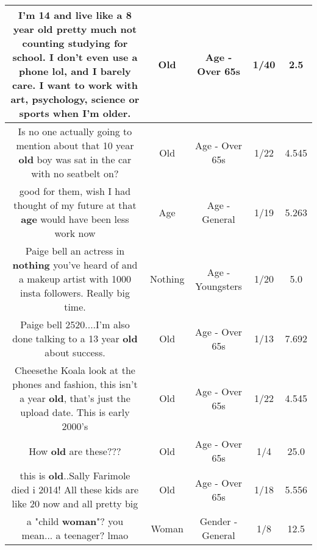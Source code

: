 \documentclass[11pt]{article}
\newlength\mylength
\begin{document}
\begin{center}
\begin{longtable}{|C{.65\mylength}|C{.30\mylength}|C{.12\mylength}|C{.12\mylength}|C{.12\mylength}|}
  \small I'm 14 and live like a 8 year \textbf{old} pretty much not counting studying for school. I don't even use a phone lol, and I barely care. I want to work with art, psychology, science or sports when I'm older.\normalsize   & Old & Age - Over 65s & 1/40 & 2.5 \\  \hline
  \small Is no one actually going to mention about that 10 year \textbf{old} boy was sat in the car with no seatbelt on?\normalsize   & Old & Age - Over 65s & 1/22 & 4.545 \\  \hline
  \small good for them, wish I had thought of my future at that \textbf{age} would have been less work now\normalsize   & Age & Age - General & 1/19 & 5.263 \\  \hline
  \small Paige bell an actress in \textbf{nothing} you've heard of and a makeup artist with 1000 insta followers. Really big time.\normalsize   & Nothing & Age - Youngsters & 1/20 & 5.0 \\  \hline
  \small Paige bell 2520....I'm also done talking to a 13 year \textbf{old} about success.\normalsize   & Old & Age - Over 65s & 1/13 & 7.692 \\  \hline
  \small Cheesethe Koala look at the phones and fashion, this isn't a year \textbf{old}, that's just the upload date. This is early 2000's\normalsize   & Old & Age - Over 65s & 1/22 & 4.545 \\  \hline
  \small How \textbf{old} are these???\normalsize   & Old & Age - Over 65s & 1/4 & 25.0 \\  \hline
  \small this is \textbf{old}..Sally Farimole died i 2014! All these kids are like 20 now and all pretty big\normalsize   & Old & Age - Over 65s & 1/18 & 5.556 \\  \hline
  \small a "child \textbf{woman}"? you mean... a teenager? lmao\normalsize   & Woman & Gender - General & 1/8 & 12.5 \\  \hline

\end{longtable}
\end{center}
\end{document}
